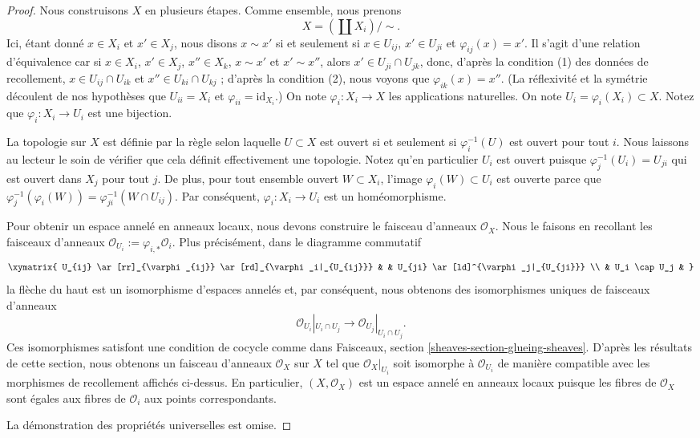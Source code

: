 \begin{proof}
Nous construisons $X$ en plusieurs étapes.
Comme ensemble, nous prenons
$$
X = (\coprod X_i) / \sim.
$$
Ici, étant donné $x \in X_i$ et $x' \in X_j$, nous
disons $x \sim x'$ si et seulement si $x \in U_{ij}$, $x' \in
U_{ji}$ et $\varphi_{ij}(x) = x'$. Il s'agit d'une relation
d'équivalence car si $x \in X_i$, $x' \in X_j$, $x'' \in X_k$, $x \sim x'$ et $x'
\sim x''$, alors $x' \in U_{ji} \cap U_{jk}$, donc, d'après la condition (1) des
données de recollement, $x \in U_{ij} \cap U_{ik}$ et $x''
\in U_{ki} \cap U_{kj}$ ; d'après la condition (2),
nous voyons que $\varphi_{ik}(x) = x''$. (La réflexivité et la symétrie
découlent de nos hypothèses que $U_{ii} = X_i$ et
$\varphi_{ii} = \text{id}_{X_i}$.) On
note $\varphi_i : X_i \to X$ les
applications naturelles. On note $U_i = \varphi_i(X_i) \subset X$.
Notez que $\varphi_i : X_i \to U_i$ est une bijection.

\medskip\noindent
La topologie sur $X$ est définie par la règle selon
laquelle $U \subset X$ est ouvert si et seulement si $\varphi_i^{-1}(U)$
est ouvert pour tout $i$. Nous laissons au lecteur le soin
de vérifier que cela définit effectivement une
topologie. Notez qu'en particulier $U_i$ est ouvert puisque $\varphi_j^{-1}(U_i)
= U_{ji}$ qui est ouvert dans $X_j$ pour tout
$j$. De plus, pour tout ensemble ouvert $W \subset X_i$,
l'image $\varphi_i(W) \subset U_i$ est ouverte
parce que $\varphi_j^{-1}(\varphi_i(W)) = \varphi_{ji}^{-1}(W \cap U_{ij})$.
Par conséquent, $\varphi_i : X_i \to U_i$ est un homéomorphisme.

\medskip\noindent
Pour obtenir un espace annelé en anneaux locaux, nous devons construire
le faisceau d'anneaux $\mathcal{O}_X$. Nous le faisons en recollant
les faisceaux d'anneaux $\mathcal{O}_{U_i} := \varphi_{i, *} \mathcal{O}_i$. Plus
précisément, dans le diagramme commutatif
$$
\xymatrix{
U_{ij} \ar[rr]_{\varphi_{ij}} \ar[rd]_{\varphi_i|_{U_{ij}}} &
&
U_{ji} \ar[ld]^{\varphi_j|_{U_{ji}}} \\ &
U_i \cap U_j &
}
$$
la flèche du haut est un isomorphisme d'espaces annelés et, par
conséquent, nous obtenons des isomorphismes uniques de faisceaux d'anneaux
$$
\mathcal{O}_{U_i}|_{U_i \cap U_j}
\longrightarrow
\mathcal{O}_{U_j}|_{U_i \cap U_j}.
$$
Ces isomorphismes satisfont une condition de cocycle comme
dans Faisceaux, section \ref{sheaves-section-glueing-sheaves}.
D'après les résultats de cette section, nous obtenons un faisceau
d'anneaux $\mathcal{O}_X$ sur $X$ tel que $\mathcal{O}_X|_{U_i}$
soit isomorphe à $\mathcal{O}_{U_i}$ de manière compatible
avec les morphismes de recollement affichés
ci-dessus. En particulier, $(X, \mathcal{O}_X)$ est un espace
annelé en anneaux locaux puisque les fibres de $\mathcal{O}_X$
sont égales aux fibres de $\mathcal{O}_i$ aux points
correspondants.

\medskip\noindent
La démonstration des propriétés universelles est omise.
\end{proof}

